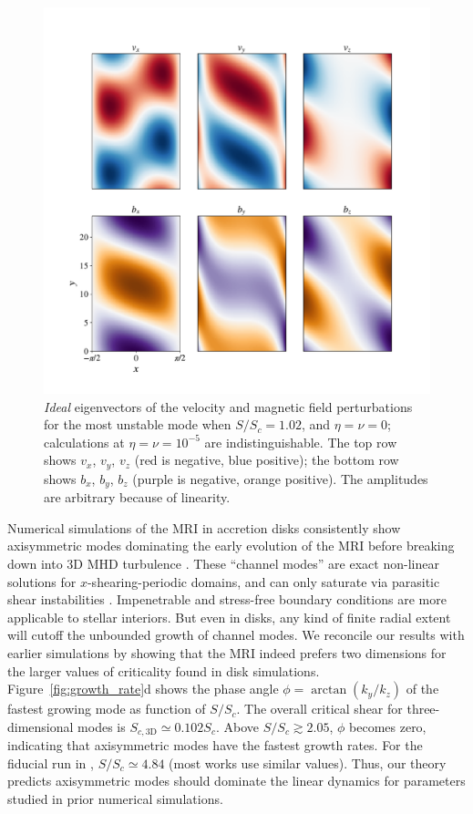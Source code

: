 \documentclass[aps,prl,reprint,superscriptaddress]{revtex4-1}
\newcommand{\SSC}{S/S_{c}}
\begin{document}
\begin{figure}[h!]
  \centering
  \includegraphics[width=\columnwidth]{eigvecs_xy_run_11_ideal_single_mode.pdf}
  \caption{\textit{Ideal} eigenvectors of the velocity and magnetic field perturbations for the most unstable mode when $\SSC=1.02$, and $\eta=\nu=0$; calculations at $\eta=\nu=10^{-5}$ are indistinguishable.
  The top row shows $v_{x}$, $v_{y}$, $v_{z}$ (red is negative, blue positive); the bottom row shows $b_{x}$, $b_{y}$, $b_{z}$ (purple is negative, orange positive). 
The amplitudes are arbitrary because of linearity.}
  \label{fig:eigvec}
\end{figure}

Numerical simulations of the MRI in accretion disks consistently show axisymmetric modes dominating the early evolution of the MRI before breaking down into 3D MHD turbulence \citep{1995ApJ...440..742H,2018ApJ...853..174H,2019ApJS..241...26D}. 
These ``channel modes'' are exact non-linear solutions for $x$-shearing-periodic domains, and can only saturate via parasitic shear instabilities \citep{1994ApJ...432..213G}.
Impenetrable and stress-free boundary conditions are more applicable to stellar interiors. 
But even in disks, any kind of finite radial extent will cutoff the unbounded growth of channel modes. 
We reconcile our results with earlier simulations by showing that the MRI indeed prefers two dimensions for the larger values of criticality found in disk simulations. 
Figure~\ref{fig:growth_rate}d shows the phase angle $\phi=\arctan(k_{y}/k_{z})$ of the fastest growing mode as function of $\SSC$.
The overall critical shear for three-dimensional modes is $S_{c,\text{3D}}\simeq0.102S_c$.
Above $\SSC\gtrsim2.05$, $\phi$ becomes zero, indicating that axisymmetric modes have the fastest growth rates.
For the fiducial run in \citet{1996ApJ...464..690H}, $\SSC\simeq4.84$ (most works use similar values).
Thus, our theory predicts axisymmetric modes should dominate the linear dynamics for parameters studied in prior numerical simulations.
\end{document}
